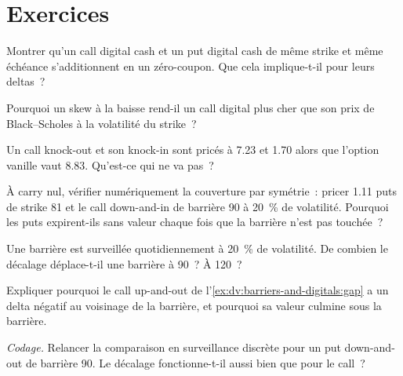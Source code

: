 \section{Exercices}

\begin{exercise}[$\star$]\label{exo:dv:barriers-and-digitals:1}
Montrer qu'un call digital cash et un put digital cash de même strike et même échéance s'additionnent en un zéro-coupon. Que
cela implique-t-il pour leurs deltas~?
\end{exercise}

\begin{exercise}[$\star$]\label{exo:dv:barriers-and-digitals:2}
Pourquoi un skew à la baisse rend-il un call digital plus cher que son prix de Black--Scholes à la volatilité du strike~?
\end{exercise}

\begin{exercise}[$\star$]\label{exo:dv:barriers-and-digitals:3}
Un call knock-out et son knock-in sont pricés à 7.23 et 1.70 alors que l'option vanille vaut 8.83. Qu'est-ce qui ne va pas~?
\end{exercise}

\begin{exercise}[$\star\star$]\label{exo:dv:barriers-and-digitals:4}
À carry nul, vérifier numériquement la couverture par symétrie~: pricer 1.11 puts de strike 81 et le call down-and-in de
barrière 90 à 20~\% de volatilité. Pourquoi les puts expirent-ils sans valeur chaque fois que la barrière n'est pas touchée~?
\end{exercise}

\begin{exercise}[$\star\star$]\label{exo:dv:barriers-and-digitals:5}
Une barrière est surveillée quotidiennement à 20~\% de volatilité. De combien le décalage déplace-t-il une barrière à 90~? À 120~?
\end{exercise}

\begin{exercise}[$\star\star$]\label{exo:dv:barriers-and-digitals:6}
Expliquer pourquoi le call up-and-out de l'\cref{ex:dv:barriers-and-digitals:gap} a un delta négatif au voisinage de la barrière, et pourquoi
sa valeur culmine sous la barrière.
\end{exercise}

\begin{exercise}[$\star\star\star$]\label{exo:dv:barriers-and-digitals:7}
\emph{Codage.} Relancer la comparaison en surveillance discrète pour un put down-and-out de barrière 90. Le décalage fonctionne-t-il aussi bien
que pour le call~?
\end{exercise}

